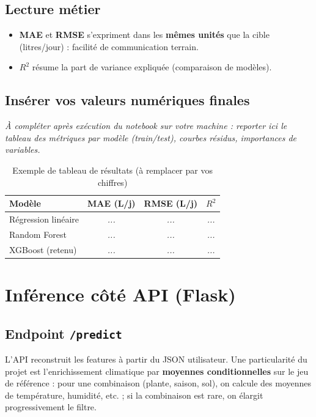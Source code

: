 \documentclass[12pt,a4paper,twoside,openright]{report}
\begin{document}
\subsection{Lecture métier}
\begin{itemize}
  \item \textbf{MAE} et \textbf{RMSE} s'expriment dans les \textbf{mêmes unités} que la cible (litres/jour) : facilité de communication terrain.
  \item \textbf{$R^2$} résume la part de variance expliquée (comparaison de modèles).
\end{itemize}

\subsection{Insérer vos valeurs numériques finales}
\textit{À compléter après exécution du notebook sur votre machine : reporter ici le tableau des métriques par modèle (train/test), courbes résidus, importances de variables.}

\begin{table}[H]
  \centering
  \caption{Exemple de tableau de résultats (à remplacer par vos chiffres)}
  \label{tab:metrics}
  \begin{tabular}{@{}lccc@{}}
    \toprule
    \textbf{Modèle} & \textbf{MAE (L/j)} & \textbf{RMSE (L/j)} & \textbf{$R^2$} \\
    \midrule
    Régression linéaire & \textit{...} & \textit{...} & \textit{...} \\
    Random Forest & \textit{...} & \textit{...} & \textit{...} \\
    XGBoost (retenu) & \textit{...} & \textit{...} & \textit{...} \\
    \bottomrule
  \end{tabular}
\end{table}

\section{Inférence côté API (Flask)}

\subsection{Endpoint \texttt{/predict}}
L'API reconstruit les features à partir du JSON utilisateur. Une particularité du projet est l'enrichissement climatique par \textbf{moyennes conditionnelles} sur le jeu de référence : pour une combinaison (plante, saison, sol), on calcule des moyennes de température, humidité, etc. ; si la combinaison est rare, on élargit progressivement le filtre.
\end{document}
